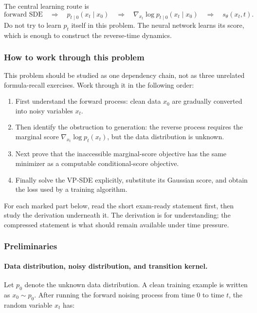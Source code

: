 \documentclass[11pt,a4paper]{article}
\theoremstyle{definition}
\begin{document}
\begin{note}
    The central learning route is
    \[
    \text{forward SDE} \quad \Longrightarrow \quad p_{t\mid 0}(x_t\mid x_0) \quad \Longrightarrow \quad \nabla_{x_t}\log p_{t\mid 0}(x_t\mid x_0) \quad \Longrightarrow \quad s_\theta(x_t,t).
    \]
    Do not try to learn $p_t$ itself in this problem. The neural network learns its score, which is enough to construct the reverse-time dynamics.
\end{note}

\subsubsection{How to work through this problem}

This problem should be studied as one dependency chain, not as three unrelated formula-recall exercises. Work through it in the following order:

\begin{enumerate}
    \item First understand the forward process: clean data $x_0$ are gradually converted into noisy variables $x_t$.
    \item Then identify the obstruction to generation: the reverse process requires the marginal score $\nabla_{x_t}\log p_t(x_t)$, but the data distribution is unknown.
    \item Next prove that the inaccessible marginal-score objective has the same minimizer as a computable conditional-score objective.
    \item Finally solve the VP-SDE explicitly, substitute its Gaussian score, and obtain the loss used by a training algorithm.
\end{enumerate}

For each marked part below, read the short exam-ready statement first, then study the derivation underneath it. The derivation is for understanding; the compressed statement is what should remain available under time pressure.

\subsubsection{Preliminaries}

\paragraph{Data distribution, noisy distribution, and transition kernel.}
Let $p_0$ denote the unknown data distribution. A clean training example is written as $x_0 \sim p_0$. After running the forward noising process from time $0$ to time $t$, the random variable $x_t$ has:
\end{document}

